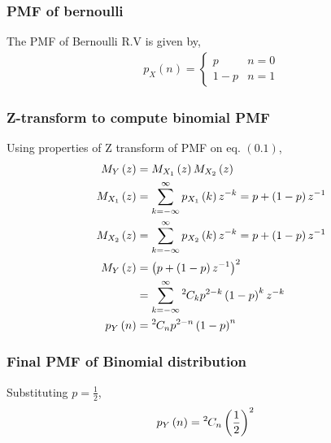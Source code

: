 \documentclass{beamer}
\providecommand{\brak}[1]{\ensuremath{\left(#1\right)}}
\theoremstyle{remark}
\let\vec\mathbf
\numberwithin{equation}{section}
\begin{document}
\begin{frame}
\frametitle{PMF of bernoulli}
The PMF of Bernoulli R.V is given by,
\begin{align}
  p_X\brak{n} = \begin{cases}
    p & n = 0\\
    1-p & n = 1
  \end{cases}
\end{align}

\end{frame}
\begin{frame}
\frametitle{Z-transform to compute binomial PMF}

Using properties of Z transform of PMF on eq. \brak{0.1},
\begin{align}
  M_Y\brak{z} &= M_{X_1}\brak{z}M_{X_2}\brak{z}\\
  M_{X_1}\brak{z} &= \sum_{k = -\infty}^{\infty} p_{X_1}\brak{k}z^{-k} = p + \brak{1-p}z^{-1}\\
  M_{X_2}\brak{z} &= \sum_{k = -\infty}^{\infty} p_{X_2}\brak{k}z^{-k} = p + \brak{1-p}z^{-1}\\
  M_Y\brak{z} &= \brak{p + \brak{1-p}z^{-1}}^2\\
              &= \sum_{k = -\infty}^{\infty} \comb{2}{k}p^{2-k}\brak{1-p}^{k}z^{-k}\\
  p_Y\brak{n} &= \comb{2}{n} p^{2-n}\brak{1-p}^n
\end{align}
\end{frame}
\begin{frame}
\frametitle{Final PMF of Binomial distribution}
Substituting $p = \frac{1}{2}$,
\begin{align}
  p_Y\brak{n} &= \comb{2}{n}\brak{\frac{1}{2}}^2
\end{align}
\end{frame}
\end{document}
